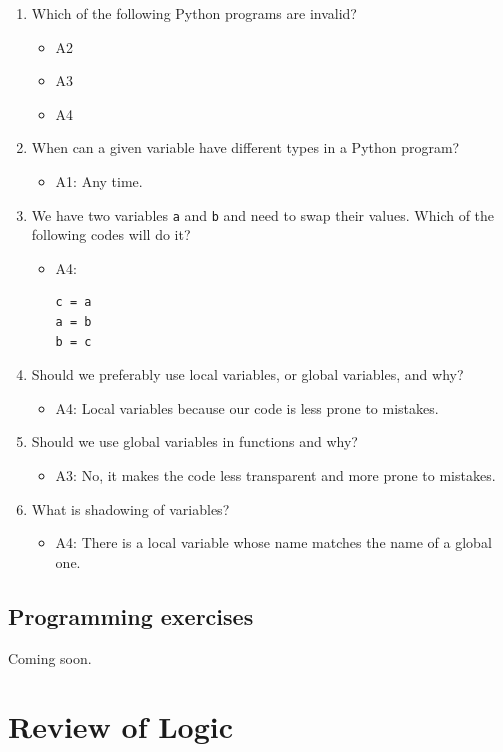 \documentclass[article,A4,12pt]{llncs}
\begin{document}
\begin{enumerate}
\item Which of the following Python programs are invalid?
  \begin{itemize}
    \item A2
    \item A3
    \item A4
  \end{itemize}
\item When can a given variable have different types in a Python program?
  \begin{itemize}
    \item A1: Any time.
  \end{itemize}
\item We have two variables {\tt a} and {\tt b} and need to swap their values. Which of the 
following codes will do it?
  \begin{itemize}
    \item A4:
\begin{verbatim}
c = a
a = b
b = c
\end{verbatim}
  \end{itemize}
\item Should we preferably use local variables, or global variables, and why?
  \begin{itemize}
    \item A4: Local variables because our code is less prone to mistakes. 
  \end{itemize}
\item Should we use global variables in functions and why?
  \begin{itemize}
    \item A3: No, it makes the code less transparent and more prone to mistakes.
  \end{itemize}
\item What is shadowing of variables?
  \begin{itemize}
    \item A4: There is a local variable whose name matches the name of a global one.
  \end{itemize}
\end{enumerate}


\subsection{Programming exercises}

Coming soon.


\section{Review of Logic}
\end{document}
